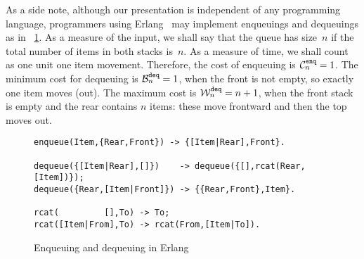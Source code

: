 As a side note, although our presentation is independent of any
programming language, programmers using
\textsf{Erlang}~\cite{Armstrong:2007,Armstrong:2010} may implement
enqueuings and dequeuings as in \fig~\ref{fig:erlang}. As a measure of
the input, we shall say that the queue has size~\(n\) if the total
number of items in both stacks is~\(n\). As a measure of time, we
shall count as one unit one item movement. Therefore, the cost of
enqueuing is \(\C{\texttt{enq}}{n} = 1\). The minimum cost for
dequeuing is \(\B{\texttt{deq}}{n} = 1\), when the front is not empty,
so exactly one item moves (out). The maximum cost is
\(\W{\texttt{deq}}{n} = n+1\), when the front stack is empty and the
rear contains \(n\) items: these move frontward and then the top moves
out.
\begin{figure}[!t]
\centering
\small
\begin{verbatim}
enqueue(Item,{Rear,Front}) -> {[Item|Rear],Front}.

dequeue({[Item|Rear],[]})    -> dequeue({[],rcat(Rear,[Item])});
dequeue({Rear,[Item|Front]}) -> {{Rear,Front},Item}.

rcat(         [],To) -> To;
rcat([Item|From],To) -> rcat(From,[Item|To]).
\end{verbatim}
\caption{Enqueuing and dequeuing in \textsf{Erlang}\label{fig:erlang}}
\end{figure}

